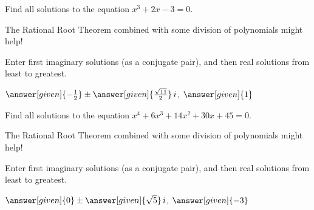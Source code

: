 \documentclass[nooutcomes]{ximera}
\begin{document}
\begin{problem}
Find all solutions to the equation $x^3+2x-3=0$. 
\begin{hint} 
The Rational Root Theorem combined with some division of polynomials might help!
\end{hint}
Enter first imaginary solutions (as a conjugate pair), and then real solutions from least to greatest.

\begin{prompt}
$\answer[given]{-\frac{1}{2}} \pm \answer[given]{\frac{\sqrt{11}}{2}}\,i$, $\answer[given]{1}$
\end{prompt}
\end{problem}


\begin{problem}
Find all solutions to the equation $x^4+6x^3+14x^2+30x+45=0$. 
\begin{hint} 
The Rational Root Theorem combined with some division of polynomials might help!
\end{hint}
Enter first imaginary solutions (as a conjugate pair), and then real solutions from least to greatest.

\begin{prompt}
$\answer[given]{0} \pm \answer[given]{\sqrt{5}}\,i$, $\answer[given]{-3}$
\end{prompt}
\end{problem}
\end{document}

